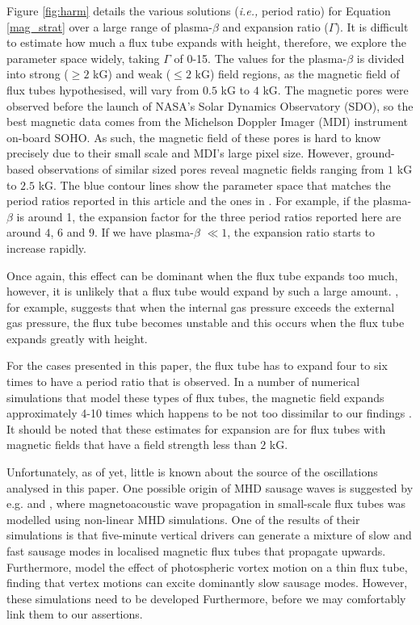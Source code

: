     Figure \ref{fig:harm} details the various solutions (\textit{i.e.,} period ratio) for Equation \ref{mag_strat} over a large range of plasma-$\beta$ and expansion ratio ($\Gamma$).
    It is difficult to estimate how much a flux tube expands with height, therefore, we explore the parameter space widely, taking $\Gamma$ of 0-15.
    The values for the plasma-$\beta$ is divided into strong ($\geq2$ kG) and weak ($\leq2$ kG) field regions, as the magnetic field of flux tubes hypothesised, will vary from $0.5$ kG to $4$ kG.
    The magnetic pores were observed before the launch of NASA's Solar Dynamics Observatory (SDO),
    so the best magnetic data comes from the Michelson Doppler Imager (MDI) instrument on-board SOHO.
    As such, the magnetic field of these pores is hard to know precisely due to their small scale and MDI's large pixel size.
    However, ground-based observations of similar sized pores reveal magnetic fields ranging from $1$ kG to $2.5$ kG.
    The blue contour lines show the parameter space that matches the period ratios reported in this article and the ones in \citet{Dorotovic2014}.
    For example, if the plasma-$\beta$ is around 1, the expansion factor for the three period ratios reported here are around $4$, $6$ and $9$.
    If we have plasma-$\beta$ $\ll 1$, the expansion ratio starts to increase rapidly. 
    
    Once again, this effect can be dominant when the flux tube expands too much, however, it is unlikely that a flux tube would expand by such a large amount.
    \citet{1982GApFD21237B}, for example, suggests that when the internal gas pressure exceeds the external gas pressure, the flux tube becomes unstable and this occurs when the flux tube expands greatly with height.
    
    For the cases presented in this paper, the flux tube has to expand four to six times to have a period ratio that is observed.
    In a number of numerical simulations that model these types of flux tubes, the magnetic field expands approximately 4-10 times which happens to be not too dissimilar to our findings \citep[see also][]{khomenko,fedun2,fedun1}.
    It should be noted that these estimates for expansion are for flux tubes with magnetic fields that have a field strength less than $2$ kG. 
    
    Unfortunately, as of yet, little is known about the source of the oscillations analysed in this paper.
    One possible origin of MHD sausage waves is suggested by e.g. \citet{khomenko} and \citet{fedun2}, where magnetoacoustic wave propagation in small-scale flux tubes was modelled using non-linear MHD simulations.
    One of the results of their simulations is that five-minute vertical drivers can generate a mixture of slow and fast sausage modes in localised magnetic flux tubes that propagate upwards.
    Furthermore, \citet{fedun1} model the effect of photospheric vortex motion on a thin flux tube, finding that vertex motions can excite dominantly slow sausage modes.
    However, these simulations need to be developed Furthermore, before we may comfortably link them to our assertions.

